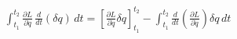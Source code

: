 \documentclass[preview]{standalone}
\begin{document}
\begin{align*}
\int_{t_1}^{t_2} \frac{\partial L}{\partial \dot{q}} \, \frac{d}{dt} (\delta q) \, dt = \left[ \frac{\partial L}{\partial \dot{q}} \delta q \right]_{t_1}^{t_2} - \int_{t_1}^{t_2} \frac{d}{dt} \left( \frac{\partial L}{\partial \dot{q}} \right) \delta q \, dt
\end{align*}
\end{document}
